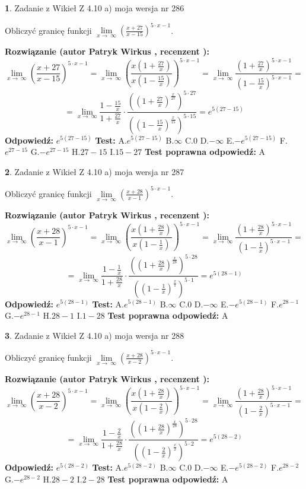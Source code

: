 \documentclass[12pt, a4paper]{article}
\theoremstyle{definition} %
\newtheorem{zad}{}
\newcommand{\zadStart}[1]{\begin{zad}#1\newline}
\newcommand{\zadStop}{\end{zad}}
\newcommand{\rozwStart}[2]{\noindent \textbf{Rozwiązanie (autor #1 , recenzent #2): }\newline}
\newcommand{\rozwStop}{\newline}
\newcommand{\odpStart}{\noindent \textbf{Odpowiedź:}\newline}
\newcommand{\odpStop}{\newline}
\newcommand{\testStart}{\noindent \textbf{Test:}\newline}
\newcommand{\testStop}{\newline}
\newcommand{\kluczStart}{\noindent \textbf{Test poprawna odpowiedź:}\newline}
\newcommand{\kluczStop}{\newline}
\begin{document}
\zadStart{Zadanie z Wikieł Z 4.10 a) moja wersja nr 286}


Obliczyć granicę funkcji  $\lim\limits_{x\to\ \infty}(\frac{x+27}{x-15})^{5\cdot x-1}$.
\zadStop
\rozwStart{Patryk Wirkus}{}
$$\lim\limits_{x\to\ \infty}(\frac{x+27}{x-15})^{5\cdot x-1} = \lim\limits_{x\to\ \infty}(\frac{x(1+\frac{27}{x})}{x(1-\frac{15}{x})})^{5\cdot x-1}=\lim\limits_{x\to\ \infty}\frac{(1+\frac{27}{x})^{5\cdot x-1}}{(1-\frac{15}{x})^{5\cdot x-1}}=$$
$$=\lim\limits_{x\to\ \infty}\frac{1-\frac{15}{x}}{1+\frac{27}{x}}\cdot\frac{((1+\frac{27}{x})^{\frac{x}{27}})^{5\cdot27}}{((1-\frac{15}{x})^{\frac{x}{15}})^{5\cdot15}}=e^{5(27-15)}$$
\rozwStop
\odpStart
$e^{5(27-15)}$
\odpStop
\testStart
A.$e^{5(27-15)}$ B.$\infty$ C.$0$ D.$-\infty$ E.$-e^{5(27-15)}$
F.$e^{27-15}$ G.$-e^{27-15}$
H.$27-15$
I.$15-27$
\testStop
\kluczStart
A
\kluczStop



\zadStart{Zadanie z Wikieł Z 4.10 a) moja wersja nr 287}


Obliczyć granicę funkcji  $\lim\limits_{x\to\ \infty}(\frac{x+28}{x-1})^{5\cdot x-1}$.
\zadStop
\rozwStart{Patryk Wirkus}{}
$$\lim\limits_{x\to\ \infty}(\frac{x+28}{x-1})^{5\cdot x-1} = \lim\limits_{x\to\ \infty}(\frac{x(1+\frac{28}{x})}{x(1-\frac{1}{x})})^{5\cdot x-1}=\lim\limits_{x\to\ \infty}\frac{(1+\frac{28}{x})^{5\cdot x-1}}{(1-\frac{1}{x})^{5\cdot x-1}}=$$
$$=\lim\limits_{x\to\ \infty}\frac{1-\frac{1}{x}}{1+\frac{28}{x}}\cdot\frac{((1+\frac{28}{x})^{\frac{x}{28}})^{5\cdot28}}{((1-\frac{1}{x})^{\frac{x}{1}})^{5\cdot1}}=e^{5(28-1)}$$
\rozwStop
\odpStart
$e^{5(28-1)}$
\odpStop
\testStart
A.$e^{5(28-1)}$ B.$\infty$ C.$0$ D.$-\infty$ E.$-e^{5(28-1)}$
F.$e^{28-1}$ G.$-e^{28-1}$
H.$28-1$
I.$1-28$
\testStop
\kluczStart
A
\kluczStop



\zadStart{Zadanie z Wikieł Z 4.10 a) moja wersja nr 288}


Obliczyć granicę funkcji  $\lim\limits_{x\to\ \infty}(\frac{x+28}{x-2})^{5\cdot x-1}$.
\zadStop
\rozwStart{Patryk Wirkus}{}
$$\lim\limits_{x\to\ \infty}(\frac{x+28}{x-2})^{5\cdot x-1} = \lim\limits_{x\to\ \infty}(\frac{x(1+\frac{28}{x})}{x(1-\frac{2}{x})})^{5\cdot x-1}=\lim\limits_{x\to\ \infty}\frac{(1+\frac{28}{x})^{5\cdot x-1}}{(1-\frac{2}{x})^{5\cdot x-1}}=$$
$$=\lim\limits_{x\to\ \infty}\frac{1-\frac{2}{x}}{1+\frac{28}{x}}\cdot\frac{((1+\frac{28}{x})^{\frac{x}{28}})^{5\cdot28}}{((1-\frac{2}{x})^{\frac{x}{2}})^{5\cdot2}}=e^{5(28-2)}$$
\rozwStop
\odpStart
$e^{5(28-2)}$
\odpStop
\testStart
A.$e^{5(28-2)}$ B.$\infty$ C.$0$ D.$-\infty$ E.$-e^{5(28-2)}$
F.$e^{28-2}$ G.$-e^{28-2}$
H.$28-2$
I.$2-28$
\testStop
\kluczStart
A
\kluczStop
\end{document}
